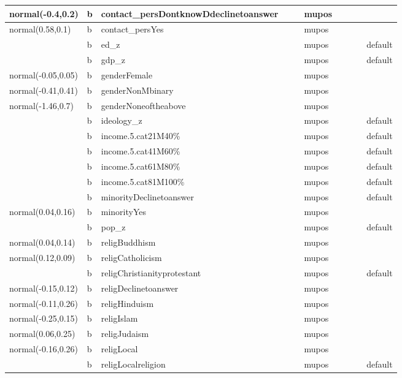 \documentclass[
]{book}
\theoremstyle{definition}
\theoremstyle{definition}
\theoremstyle{definition}
\theoremstyle{definition}
\theoremstyle{remark}
\begin{document}
\begin{table}
\begin{tabular}[t]{l|l|l|l|l|l|l|l|l|l}
\hline
normal(-0.4,0.2) & b & contact\_persDontknowDdeclinetoanswer &  &  & mupos &  &  &  & \\
\hline
normal(0.58,0.1) & b & contact\_persYes &  &  & mupos &  &  &  & \\
\hline
 & b & ed\_z &  &  & mupos &  &  &  & default\\
\hline
 & b & gdp\_z &  &  & mupos &  &  &  & default\\
\hline
normal(-0.05,0.05) & b & genderFemale &  &  & mupos &  &  &  & \\
\hline
normal(-0.41,0.41) & b & genderNonMbinary &  &  & mupos &  &  &  & \\
\hline
normal(-1.46,0.7) & b & genderNoneoftheabove &  &  & mupos &  &  &  & \\
\hline
 & b & ideology\_z &  &  & mupos &  &  &  & default\\
\hline
 & b & income.5.cat21M40\% &  &  & mupos &  &  &  & default\\
\hline
 & b & income.5.cat41M60\% &  &  & mupos &  &  &  & default\\
\hline
 & b & income.5.cat61M80\% &  &  & mupos &  &  &  & default\\
\hline
 & b & income.5.cat81M100\% &  &  & mupos &  &  &  & default\\
\hline
 & b & minorityDeclinetoanswer &  &  & mupos &  &  &  & default\\
\hline
normal(0.04,0.16) & b & minorityYes &  &  & mupos &  &  &  & \\
\hline
 & b & pop\_z &  &  & mupos &  &  &  & default\\
\hline
normal(0.04,0.14) & b & religBuddhism &  &  & mupos &  &  &  & \\
\hline
normal(0.12,0.09) & b & religCatholicism &  &  & mupos &  &  &  & \\
\hline
 & b & religChristianityprotestant &  &  & mupos &  &  &  & default\\
\hline
normal(-0.15,0.12) & b & religDeclinetoanswer &  &  & mupos &  &  &  & \\
\hline
normal(-0.11,0.26) & b & religHinduism &  &  & mupos &  &  &  & \\
\hline
normal(-0.25,0.15) & b & religIslam &  &  & mupos &  &  &  & \\
\hline
normal(0.06,0.25) & b & religJudaism &  &  & mupos &  &  &  & \\
\hline
normal(-0.16,0.26) & b & religLocal &  &  & mupos &  &  &  & \\
\hline
 & b & religLocalreligion &  &  & mupos &  &  &  & default\\

\end{tabular}
\end{table}
\end{document}
